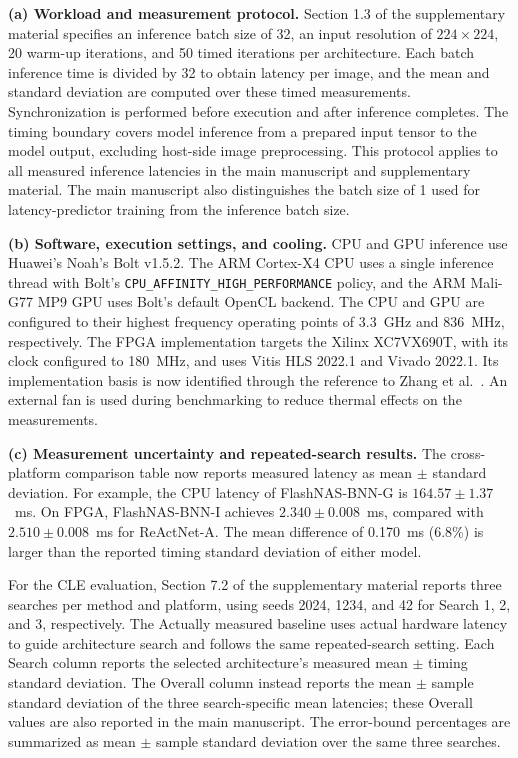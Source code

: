 \documentclass[11pt]{article}
\begin{document}
\begin{enumerate}[leftmargin=0pt,label={},itemsep=5mm]
\textbf{(a) Workload and measurement protocol.} Section 1.3 of the supplementary material specifies an inference batch size of 32, an input resolution of $224\times224$, 20 warm-up iterations, and 50 timed iterations per architecture. Each batch inference time is divided by 32 to obtain latency per image, and the mean and standard deviation are computed over these timed measurements. Synchronization is performed before execution and after inference completes. The timing boundary covers model inference from a prepared input tensor to the model output, excluding host-side image preprocessing. This protocol applies to all measured inference latencies in the main manuscript and supplementary material. The main manuscript also distinguishes the batch size of 1 used for latency-predictor training from the inference batch size.

\textbf{(b) Software, execution settings, and cooling.} CPU and GPU inference use Huawei's Noah's Bolt v1.5.2. The ARM Cortex-X4 CPU uses a single inference thread with Bolt's \texttt{CPU\_AFFINITY\_HIGH\_PERFORMANCE} policy, and the ARM Mali-G77 MP9 GPU uses Bolt's default OpenCL backend. The CPU and GPU are configured to their highest frequency operating points of 3.3~GHz and 836~MHz, respectively. The FPGA implementation targets the Xilinx XC7VX690T, with its clock configured to 180~MHz, and uses Vitis HLS 2022.1 and Vivado 2022.1. Its implementation basis is now identified through the reference to Zhang et al.~\cite{Zhang2025}. An external fan is used during benchmarking to reduce thermal effects on the measurements.

\textbf{(c) Measurement uncertainty and repeated-search results.} The cross-platform comparison table now reports measured latency as mean $\pm$ standard deviation. For example, the CPU latency of FlashNAS-BNN-G is $164.57\pm1.37$~ms. On FPGA, FlashNAS-BNN-I achieves $2.340\pm0.008$~ms, compared with $2.510\pm0.008$~ms for ReActNet-A. The mean difference of 0.170~ms (6.8\%) is larger than the reported timing standard deviation of either model.

For the CLE evaluation, Section 7.2 of the supplementary material reports three searches per method and platform, using seeds 2024, 1234, and 42 for Search 1, 2, and 3, respectively. The Actually measured baseline uses actual hardware latency to guide architecture search and follows the same repeated-search setting. Each Search column reports the selected architecture's measured mean $\pm$ timing standard deviation. The Overall column instead reports the mean $\pm$ sample standard deviation of the three search-specific mean latencies; these Overall values are also reported in the main manuscript. The error-bound percentages are summarized as mean $\pm$ sample standard deviation over the same three searches.


\end{enumerate}
\end{document}
